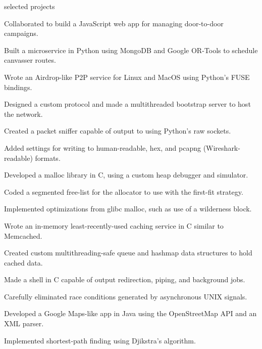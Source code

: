 \documentclass{cv}
\begin{document}
\begin{cvsection}{selected projects}
  {
    \item Collaborated to build a JavaScript web app for managing door-to-door campaigns.
    \item Built a microservice in Python using MongoDB and Google OR-Tools to schedule canvasser routes.
  }
  {
    \item Wrote an Airdrop-like P2P service for Linux and MacOS using Python's FUSE bindings.
    \item Designed a custom protocol and made a multithreaded bootstrap server to host the network.
  }
  {
    \item Created a packet sniffer capable of output to using Python's raw sockets.
    \item Added settings for writing to human-readable, hex, and pcapng (Wireshark-readable) formats.
  }
  {
    \item Developed a malloc library in C, using a custom heap debugger and simulator.
    \item Coded a segmented free-list for the allocator to use with the first-fit strategy.
    \item Implemented optimizations from glibc malloc, such as use of a wilderness block.
  }
  {
    \item Wrote an in-memory least-recently-used caching service in C similar to Memcached.
    \item Created custom multithreading-safe queue and hashmap data structures to hold cached data.
  }
  {
    \item Made a shell in C capable of output redirection, piping, and background jobs. 
    \item Carefully eliminated race conditions generated by asynchronous UNIX signals.
  }
  {
    \item Developed a Google Maps-like app in Java using the OpenStreetMap API and an XML parser.
    \item Implemented shortest-path finding using Djikstra's algorithm.
  }
\end{cvsection}
\end{document}
